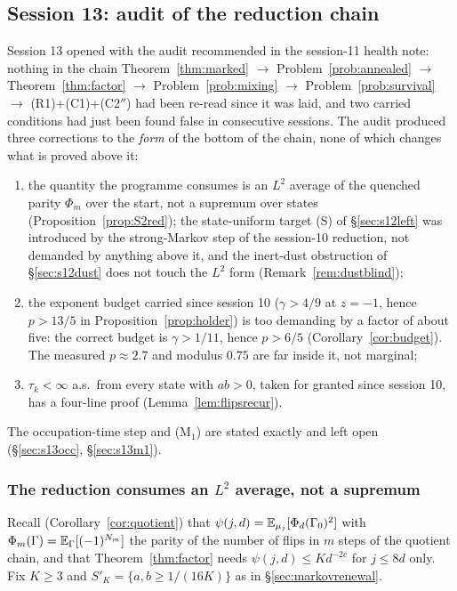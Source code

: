 \subsection{Session 13: audit of the reduction chain}\label{sec:s13}

Session 13 opened with the audit recommended in the session-11 health
note: nothing in the chain Theorem~\ref{thm:marked} $\to$
Problem~\ref{prob:annealed} $\to$ Theorem~\ref{thm:factor} $\to$
Problem~\ref{prob:mixing} $\to$ Problem~\ref{prob:survival} $\to$
(R1)+(C1)+(C2$''$) had been re-read since it was laid, and two carried
conditions had just been found false in consecutive sessions.  The
audit produced three corrections to the \emph{form} of the bottom of
the chain, none of which changes what is proved above it:
\begin{enumerate}[leftmargin=2.2em]
\item[(1)] the quantity the programme consumes is an $L^2$ average of
the quenched parity $\Phi_m$ over the start, not a supremum over
states (Proposition~\ref{prop:S2red}); the state-uniform target (S)
of \S\ref{sec:s12left} was introduced by the strong-Markov step of
the session-10 reduction, not demanded by anything above it, and the
inert-dust obstruction of \S\ref{sec:s12dust} does not touch the
$L^2$ form (Remark~\ref{rem:dustblind});
\item[(2)] the exponent budget carried since session 10
($\gamma>4/9$ at $z=-1$, hence $p>13/5$ in
Proposition~\ref{prop:holder}) is too demanding by a factor of
about five: the correct budget is $\gamma>1/11$, hence $p>6/5$
(Corollary~\ref{cor:budget}).  The measured $p\approx2.7$ and
modulus $0.75$ are far inside it, not marginal;
\item[(3)] $\tau_k<\infty$ a.s.\ from every state with $ab>0$, taken
for granted since session 10, has a four-line proof
(Lemma~\ref{lem:flipsrecur}).
\end{enumerate}
The occupation-time step and (M$_1$) are stated exactly and left open
(\S\ref{sec:s13occ}, \S\ref{sec:s13m1}).

\subsubsection{The reduction consumes an \texorpdfstring{$L^2$}{L2} average, not a supremum}
\label{sec:s13ltwo}

Recall (Corollary~\ref{cor:quotient}) that
$\psi(j,d)=\mathbb{E}_{\mu_j}[\Phi_d(\Gamma_0)^2]$ with
$\Phi_m(\Gamma)=\mathbb{E}_\Gamma[(-1)^{N_m}]$ the parity of the number of
flips in $m$ steps of the quotient chain, and that
Theorem~\ref{thm:factor} needs $\psi(j,d)\le Kd^{-2c}$ for
$j\le8d$ only.  Fix $K\ge3$ and
$S'_K=\{a,b\ge1/(16K)\}$ as in \S\ref{sec:markovrenewal}.

